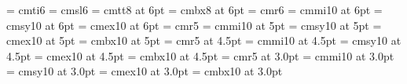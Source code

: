 %
\font\sixit   = cmti6%
\font\sixsl   = cmsl6%
\font\sixtt   = cmtt8 at 6pt%
\font\sixbf   = cmbx8 at 6pt%
%
\font\sixrm   = cmr6%
\font\sixi    = cmmi10 at 6pt%
\font\sixsy   = cmsy10 at 6pt%
\font\sixx    = cmex10 at 6pt%
%
\font\fiverm  = cmr5%
\font\fivei   = cmmi10 at 5pt%
\font\fivesy  = cmsy10 at 5pt%
\font\fivex   = cmex10 at 5pt%
\font\fivebf  = cmbx10 at 5pt%
%
\font\fourrm  = cmr5   at 4.5pt%
\font\fouri   = cmmi10 at 4.5pt%
\font\foursy  = cmsy10 at 4.5pt%
\font\fourx   = cmex10 at 4.5pt%
\font\fourbf  = cmbx10 at 4.5pt%
%
\font\threerm = cmr5   at 3.0pt%
\font\threei  = cmmi10 at 3.0pt%
\font\threesy = cmsy10 at 3.0pt%
\font\threex  = cmex10 at 3.0pt%
\font\threebf = cmbx10 at 3.0pt%
%
\def\sixpoint{\def\rm{\fam0\sixrm}%
\font\sixsc=cmcsc10 at 6pt%
\textfont0=\sixrm \scriptfont0=\fourrm \scriptscriptfont0=\threerm%
\textfont1=\sixi  \scriptfont1=\fouri  \scriptscriptfont1=\threei%
\textfont2=\sixsy \scriptfont2=\foursy \scriptscriptfont2=\threesy%
\textfont\itfam=\sixit \def\it{\fam\itfam\sixit}%
\textfont\slfam=\sixsl \def\sl{\fam\slfam\sixsl}%
\textfont\ttfam=\sixtt \def\tt{\fam\ttfam\sixtt}%
\textfont\bffam=\sixbf \scriptfont\bffam=\fourbf%
\scriptscriptfont\bffam=\threebf \def\bf{\fam\bffam\sixbf}%
\normalbaselineskip=7.2pt%
\setbox\strutbox=\hbox{\vrule height5.1pt depth2.1pt width0pt}%
\let\sc=\sixsc%
\normalbaselines\rm}%
